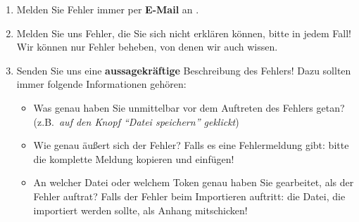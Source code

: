 \documentclass[11pt,a4paper,parskip=half]{scrartcl}
\begin{document}
\begin{enumerate}
\item Melden Sie Fehler immer per \textbf{E-Mail} an \mmb{}.
\item Melden Sie uns Fehler, die Sie sich nicht erklären können, bitte
  in jedem Fall!  Wir können nur Fehler beheben, von denen wir auch
  wissen.
\item Senden Sie uns eine \textbf{aussagekräftige} Beschreibung des
  Fehlers! Dazu sollten immer folgende Informationen gehören:
  \begin{itemize}
  \item Was genau haben Sie unmittelbar vor dem Auftreten des Fehlers
    getan? (z.B.\ \emph{auf den Knopf "`Datei speichern"' geklickt})
  \item Wie genau äußert sich der Fehler? Falls es eine Fehlermeldung
    gibt: bitte die komplette Meldung kopieren und einfügen!
  \item An welcher Datei oder welchem Token genau haben Sie
    gearbeitet, als der Fehler auftrat? Falls der Fehler beim
    Importieren auftritt: die Datei, die importiert werden sollte, als
    Anhang mitschicken!
  \end{itemize}
\end{enumerate}
\end{document}
